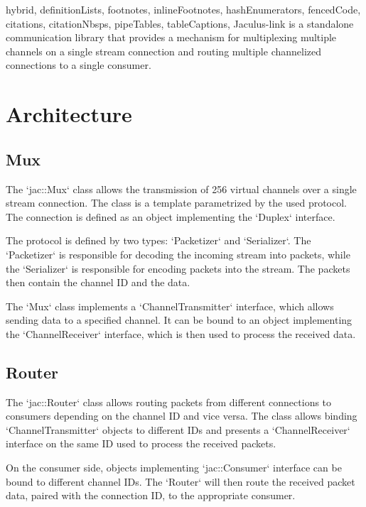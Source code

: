 \documentclass[
  digital,
  oneside,
  nosansbold,
  nocolorbold,
  lof,
  lot
]{fithesis4}
\begin{document}
\begin{markdown*}{%
  hybrid,
  definitionLists,
  footnotes,
  inlineFootnotes,
  hashEnumerators,
  fencedCode,
  citations,
  citationNbsps,
  pipeTables,
  tableCaptions,
}
Jaculus-link is a standalone communication library that provides a mechanism for multiplexing multiple channels on a single stream connection and routing multiple channelized connections to a single consumer.



\section{Architecture}

\subsection{Mux}

The `jac::Mux` class allows the transmission of 256 virtual channels over a single stream connection. The class is a template parametrized by the used protocol. The connection is defined as an object implementing the `Duplex` interface.

The protocol is defined by two types: `Packetizer` and `Serializer`. The `Packetizer` is responsible for decoding the incoming stream into packets, while the `Serializer` is responsible for encoding packets into the stream. The packets then contain the channel ID and the data.

The `Mux` class implements a `ChannelTransmitter` interface, which allows sending data to a specified channel. It can be bound to an object implementing the `ChannelReceiver` interface, which is then used to process the received data.

\subsection{Router}

The `jac::Router` class allows routing packets from different connections to consumers depending on the channel ID and vice versa. The class allows binding `ChannelTransmitter` objects to different IDs and presents a `ChannelReceiver` interface on the same ID used to process the received packets.

On the consumer side, objects implementing `jac::Consumer` interface can be bound to different channel IDs. The `Router` will then route the received packet data, paired with the connection ID, to the appropriate consumer.


\end{markdown*}
\end{document}
